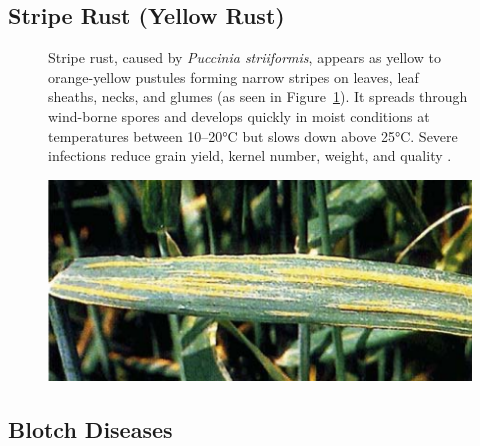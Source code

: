 \subsection{Stripe Rust (Yellow Rust)}
\begin{figure}[H]
    \centering
    \begin{minipage}{0.65\textwidth}
        
        Stripe rust, caused by \textit{Puccinia striiformis}, appears as yellow to orange-yellow pustules forming narrow stripes on leaves, leaf sheaths, necks, and glumes (as seen in Figure~\ref{fig:Figure05}). It spreads through wind-borne spores and develops quickly in moist conditions at temperatures between 10–20°C but slows down above 25°C. Severe infections reduce grain yield, kernel number, weight, and quality \parencite{duveiller2012wheat}.
    \end{minipage}%
    \hfill
    \begin{minipage}{0.3\textwidth}
        \centering
        \includegraphics[width=0.9\linewidth, angle=90]{chapters/chapter2/images/Figure05.png}
        \label{fig:Figure05}
    \end{minipage}
\end{figure}

\subsection{Blotch Diseases} 


